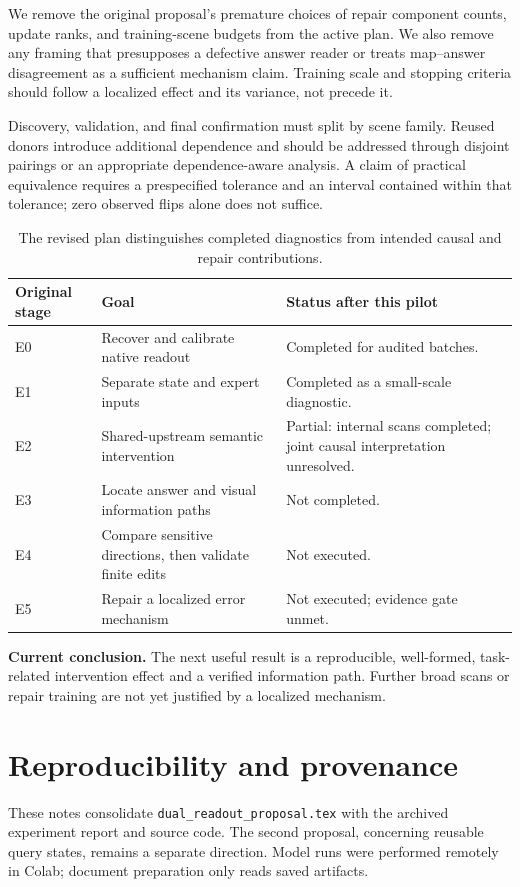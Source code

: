 \documentclass[11pt]{article}
\newcommand{\takeaway}[1]{\par\noindent\textbf{Current conclusion.} #1\par}
\begin{document}
We remove the original proposal's premature choices of repair component counts, update ranks, and training-scene budgets from the active plan. We also remove any framing that presupposes a defective answer reader or treats map--answer disagreement as a sufficient mechanism claim. Training scale and stopping criteria should follow a localized effect and its variance, not precede it.

Discovery, validation, and final confirmation must split by scene family. Reused donors introduce additional dependence and should be addressed through disjoint pairings or an appropriate dependence-aware analysis. A claim of practical equivalence requires a prespecified tolerance and an interval contained within that tolerance; zero observed flips alone does not suffice.

\begin{table}[htbp]\centering\small
\begin{tabularx}{\linewidth}{lYY}\toprule
Original stage & Goal & Status after this pilot\\\midrule
E0 & Recover and calibrate native readout & Completed for audited batches.\\
E1 & Separate state and expert inputs & Completed as a small-scale diagnostic.\\
E2 & Shared-upstream semantic intervention & Partial: internal scans completed; joint causal interpretation unresolved.\\
E3 & Locate answer and visual information paths & Not completed.\\
E4 & Compare sensitive directions, then validate finite edits & Not executed.\\
E5 & Repair a localized error mechanism & Not executed; evidence gate unmet.\\\bottomrule
\end{tabularx}\caption{The revised plan distinguishes completed diagnostics from intended causal and repair contributions.}
\end{table}
\takeaway{The next useful result is a reproducible, well-formed, task-related intervention effect and a verified information path. Further broad scans or repair training are not yet justified by a localized mechanism.}

\appendix
\section{Reproducibility and provenance}
These notes consolidate \texttt{dual\_readout\_proposal.tex} with the archived experiment report and source code. The second proposal, concerning reusable query states, remains a separate direction. Model runs were performed remotely in Colab; document preparation only reads saved artifacts.
\end{document}
